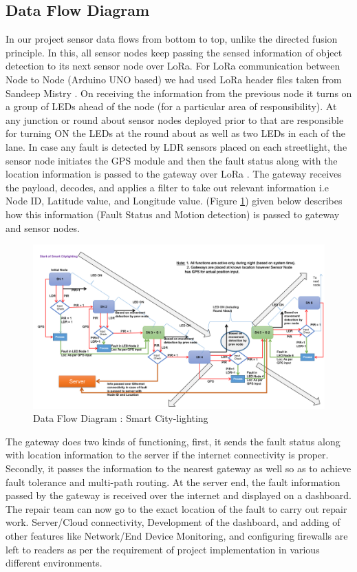 \documentclass[11pt, oneside]{article}   	%
\begin{document}
\subsection{Data Flow Diagram}

In our project sensor data flows from bottom to top, unlike the directed fusion principle. In this, all sensor nodes keep passing the sensed information of object detection to its next sensor node over LoRa\cite{13}. For LoRa communication between Node to Node (Arduino UNO based) we had used LoRa header files taken from Sandeep Mistry \cite{14}. On receiving the information from the previous node it turns on a group of LEDs ahead of the node (for a particular area of responsibility). At any junction or round about sensor nodes deployed prior to that are responsible for turning ON the LEDs at the round about as well as two LEDs in each of the lane.   In case any fault is detected by LDR sensors placed on each streetlight, the sensor node initiates the GPS module and then the fault status along with the location information is passed to the gateway over LoRa \cite{12}. The gateway receives the payload, decodes, and applies a filter to take out relevant information i.e Node ID, Latitude value, and Longitude value. (Figure \ref{DFD}) given below describes how this information (Fault Status and Motion detection) is passed to gateway and sensor nodes. 

 \begin{figure}[h]
\centering
\includegraphics[scale=0.17]{images/DFD.png}
\caption{\centering Data Flow Diagram : Smart City-lighting}
\label{DFD}
\end{figure}

The gateway does two kinds of functioning, first, it sends the fault status along with location information to the server if the internet connectivity is proper. Secondly, it passes the information to the nearest gateway as well so as to achieve fault tolerance and multi-path routing. At the server end, the fault information passed by the gateway is received over the internet and displayed on a dashboard. The repair team can now go to the exact location of the fault to carry out repair work. Server/Cloud connectivity, Development of the dashboard, and adding of other features like Network/End Device Monitoring, and configuring firewalls are left to readers as per the requirement of project implementation in various different environments.
\end{document}
